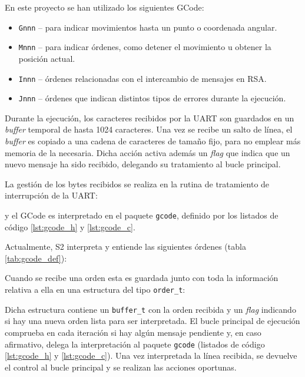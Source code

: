 En este proyecto se han utilizado los siguientes GCode:

\begin{itemize}
    \item \texttt{Gnnn} -- para indicar movimientos hasta un punto o coordenada angular.
    \item \texttt{Mnnn} -- para indicar órdenes, como detener el movimiento u obtener la posición actual.
    \item \texttt{Innn} -- órdenes relacionadas con el intercambio de mensajes en RSA.
    \item \texttt{Jnnn} -- órdenes que indican distintos tipos de errores durante la ejecución.
\end{itemize}

Durante la ejecución, los caracteres recibidos por la \ac{UART} son guardados en un
\textit{buffer} temporal de hasta 1024 caracteres. Una vez se recibe un salto de línea,
el \textit{buffer} es copiado a una cadena de caracteres de tamaño fijo, para no
emplear más memoria de la necesaria. Dicha acción activa además un \textit{flag}
que indica que un nuevo mensaje ha sido recibido, delegando su tratamiento al
bucle principal.

La gestión de los bytes recibidos se realiza en la rutina de tratamiento de
interrupción de la \ac{UART}:



y el GCode es interpretado en el paquete \texttt{gcode}, definido por los listados
de código \ref{lst:gcode_h} y \ref{lst:gcode_c}.

Actualmente, \ac{S2} interpreta y entiende las siguientes órdenes (tabla \ref{tab:gcode_def}):


Cuando se recibe una orden esta es guardada junto con toda la información relativa a
ella en una estructura del tipo \texttt{order\_t}:



Dicha estructura contiene un \texttt{buffer\_t} con la orden recibida y un \textit{flag}
indicando si hay una nueva orden lista para ser interpretada. El bucle principal de 
ejecución comprueba en cada iteración si hay algún mensaje pendiente y, en caso afirmativo,
delega la interpretación al paquete \texttt{gcode} (listados de código \ref{lst:gcode_h}
y \ref{lst:gcode_c}). Una vez interpretada la línea recibida, se devuelve el control
al bucle principal y se realizan las acciones oportunas.
